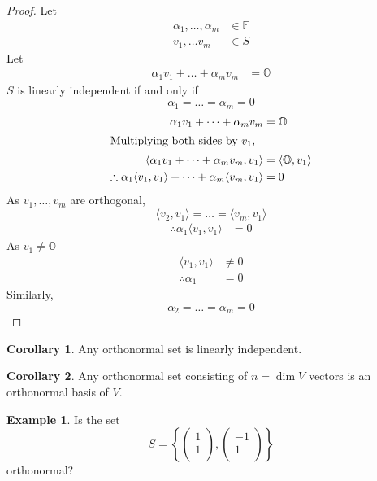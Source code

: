 \documentclass[fleqn, a4paper, 12pt]{article}
\theoremstyle{definition}
\newtheorem{example}{Example} %
\theoremstyle{theorem}
\newtheorem{corollary}{Corollary}
\theoremstyle{remark}
\numberwithin{corollary}{theorem}
\numberwithin{equation}{theorem}
\begin{document}
\begin{proof}
	Let
	\begin{align*}
		\alpha_1, \dots, \alpha_m &\in \mathbb{F}\\
		v_1, \dots v_m &\in S
	\end{align*}
	Let
	\begin{align*}
		\alpha_1 v_1 + \dots + \alpha_m v_m &= \mathbb{O}
	\end{align*}
	$S$ is linearly independent if and only if
	\begin{equation*}
		\alpha_1 = \dots = \alpha_m = 0
	\end{equation*}
	\begin{align*}
		\alpha_1 v_1 + \dots + \alpha_m v_m &= \mathbb{O}\\
		\intertext{Multiplying both sides by $v_1$,}
		\langle \alpha_1 v_1 + \dots + \alpha_m v_m, v_1 \rangle &= \langle \mathbb{O}, v_1 \rangle\\
		\therefore \alpha_1 \langle v_1, v_1 \rangle + \dots + \alpha_m \langle v_m, v_1 \rangle &= 0
	\end{align*}
	As $v_1, \dots, v_m$ are orthogonal, 
	\begin{equation*}
		\langle v_2, v_1 \rangle = \dots = \langle v_m, v_1 \rangle
	\end{equation*}
	\begin{align*}
		\therefore \alpha_1 \langle v_1, v_1 \rangle &= 0
	\end{align*}
	As $v_1 \neq \mathbb{O}$
	\begin{align*}
		\langle v_1, v_1 \rangle &\neq 0\\
		\therefore \alpha_1 &= 0
	\end{align*}
	Similarly,
	\begin{equation*}
		\alpha_2 = \dots = \alpha_m = 0
	\end{equation*}
\end{proof}

\begin{corollary}
	Any orthonormal set is linearly independent.
\end{corollary}

\begin{corollary}
	Any orthonormal set consisting of $n = \dim V$ vectors is an orthonormal basis of $V$.
\end{corollary}

\begin{example}
	Is the set
	\begin{equation*}
		S = 
			\left\lbrace
				\begin{pmatrix}
					1\\
					1\\
				\end{pmatrix}
				,
				\begin{pmatrix}
					-1\\
					1\\
				\end{pmatrix}
			\right\rbrace
	\end{equation*}
	orthonormal?
\end{example}
\end{document}
